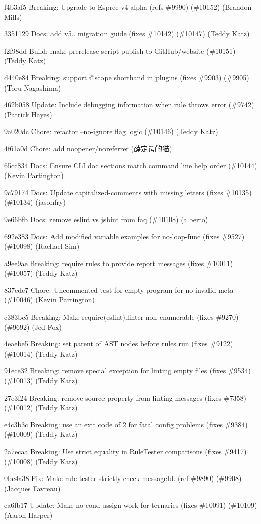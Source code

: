\begin{DoxyItemize}
\item f4b3af5 Breaking\+: Upgrade to Espree v4 alpha (refs \#9990) (\#10152) (Brandon Mills)
\item 3351129 Docs\+: add v5.. migration guide (fixes \#10142) (\#10147) (Teddy Katz)
\item f2f98dd Build\+: make prerelease script publish to Git\+Hub/website (\#10151) (Teddy Katz)
\item d440e84 Breaking\+: support @scope shorthand in plugins (fixes \#9903) (\#9905) (Toru Nagashima)
\item 462b058 Update\+: Include debugging information when rule throws error (\#9742) (Patrick Hayes)
\item 9a020dc Chore\+: refactor --no-\/ignore flag logic (\#10146) (Teddy Katz)
\item 4f61a0d Chore\+: add noopener/noreferrer (薛定谔的猫)
\item 65cc834 Docs\+: Ensure C\+LI doc sections match command line help order (\#10144) (Kevin Partington)
\item 9c79174 Docs\+: Update capitalized-\/comments with missing letters (fixes \#10135) (\#10134) (jasonfry)
\item 9e66bfb Docs\+: remove eslint vs jshint from faq (\#10108) (alberto)
\item 692e383 Docs\+: Add modified variable examples for no-\/loop-\/func (fixes \#9527) (\#10098) (Rachael Sim)
\item a9ee9ae Breaking\+: require rules to provide report messages (fixes \#10011) (\#10057) (Teddy Katz)
\item 837edc7 Chore\+: Uncommented test for empty program for no-\/invalid-\/meta (\#10046) (Kevin Partington)
\item c383bc5 Breaking\+: Make require(\textquotesingle{}eslint\textquotesingle{}).linter non-\/enumerable (fixes \#9270) (\#9692) (Jed Fox)
\item 4eaebe5 Breaking\+: set {\ttfamily parent} of A\+ST nodes before rules run (fixes \#9122) (\#10014) (Teddy Katz)
\item 91ece32 Breaking\+: remove special exception for linting empty files (fixes \#9534) (\#10013) (Teddy Katz)
\item 27e3f24 Breaking\+: remove {\ttfamily source} property from linting messages (fixes \#7358) (\#10012) (Teddy Katz)
\item e4c3b3c Breaking\+: use an exit code of 2 for fatal config problems (fixes \#9384) (\#10009) (Teddy Katz)
\item 2a7ecaa Breaking\+: Use strict equality in Rule\+Tester comparisons (fixes \#9417) (\#10008) (Teddy Katz)
\item 0bc4a38 Fix\+: Make rule-\/tester strictly check message\+Id. (ref \#9890) (\#9908) (Jacques Favreau)
\item ea6fb17 Update\+: Make no-\/cond-\/assign work for ternaries (fixes \#10091) (\#10109) (Aaron Harper)
\end{DoxyItemize}

